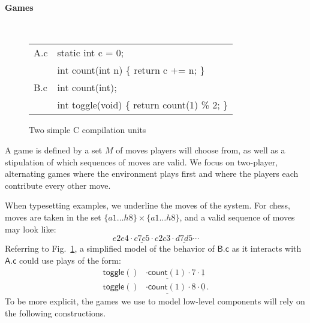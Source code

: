 \documentclass[acmsmall,authordraft]{acmart}
\newcommand{\kw}[1]{\ensuremath{ \mathsf{#1} }}
\newcommand{\que}{\circ}
\newcommand{\ans}{\bullet}
\begin{document}

\paragraph{Games} \label{sec:mainideas:gs:games} %

\begin{figure} %
  \tt
  \begin{tabular}{p{2em}l}
    \hline
    A.c & static int c = 0; \\
        & int count(int n) \{ return c += n; \} \\
    \hline
    B.c & int count(int); \\
        & int toggle(void) \{ return count(1) \% 2; \} \\
    \hline
  \end{tabular}
  \caption{Two simple C compilation units}
  \label{fig:abc}
\end{figure}

A game is defined by a set $M$ of moves
players will choose from,
as well as a stipulation of which
sequences of moves are valid.
We focus on two-player, alternating games
where the environment plays first and
where the players
each contribute every other move.

When typesetting examples,
we underline the moves of the system.
For chess,
moves are taken in the set $\{a1 \ldots h8\} \times \{a1 \ldots h8\}$,
and a valid sequence of moves may look like:
\[ e2e4 \cdot \underline{c7c5} \cdot c2c3 \cdot \underline{d7d5} \cdots \]
Referring to Fig.~\ref{fig:abc},
a simplified model of the behavior of $\textsf{B.c}$
as it interacts with $\textsf{A.c}$
could use plays of the form:
\begin{align*}
  \mathsf{toggle}() &\cdot
    \underline{\mathsf{count}(1)} \cdot 7 \cdot \underline{1} \\
  \mathsf{toggle}() &\cdot
    \underline{\mathsf{count}(1)} \cdot 8 \cdot \underline{0} \,.
\end{align*}
To be more explicit,
the games we use to model low-level components
will rely on the following constructions.

\end{document}

